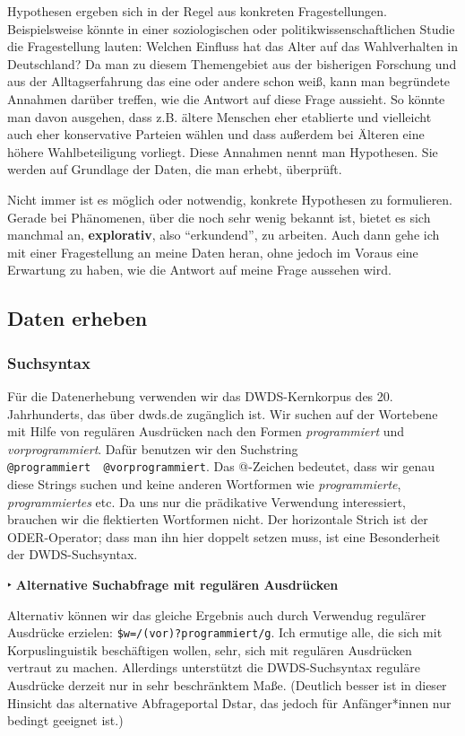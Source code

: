 \documentclass[]{article}
\begin{document}
Hypothesen ergeben sich in der Regel aus konkreten Fragestellungen.
Beispielsweise könnte in einer soziologischen oder
politikwissenschaftlichen Studie die Fragestellung lauten: Welchen
Einfluss hat das Alter auf das Wahlverhalten in Deutschland? Da man zu
diesem Themengebiet aus der bisherigen Forschung und aus der
Alltagserfahrung das eine oder andere schon weiß, kann man begründete
Annahmen darüber treffen, wie die Antwort auf diese Frage aussieht. So
könnte man davon ausgehen, dass z.B. ältere Menschen eher etablierte und
vielleicht auch eher konservative Parteien wählen und dass außerdem bei
Älteren eine höhere Wahlbeteiligung vorliegt. Diese Annahmen nennt man
Hypothesen. Sie werden auf Grundlage der Daten, die man erhebt,
überprüft.

Nicht immer ist es möglich oder notwendig, konkrete Hypothesen zu
formulieren. Gerade bei Phänomenen, über die noch sehr wenig bekannt
ist, bietet es sich manchmal an, \textbf{explorativ}, also
\enquote{erkundend}, zu arbeiten. Auch dann gehe ich mit einer
Fragestellung an meine Daten heran, ohne jedoch im Voraus eine Erwartung
zu haben, wie die Antwort auf meine Frage aussehen wird.

\subsection{Daten erheben}\label{daten-erheben}

\subsubsection{Suchsyntax}\label{suchsyntax}

Für die Datenerhebung verwenden wir das DWDS-Kernkorpus des 20.
Jahrhunderts, das über dwds.de zugänglich ist. Wir suchen auf der
Wortebene mit Hilfe von regulären Ausdrücken nach den Formen
\emph{programmiert} und \emph{vorprogrammiert}. Dafür benutzen wir den
Suchstring
\texttt{@programmiert\ \textbar{}\textbar{}\ @vorprogrammiert}. Das
@-Zeichen bedeutet, dass wir genau diese Strings suchen und keine
anderen Wortformen wie \emph{programmierte}, \emph{programmiertes} etc.
Da uns nur die prädikative Verwendung interessiert, brauchen wir die
flektierten Wortformen nicht. Der horizontale Strich \textbar{} ist der
ODER-Operator; dass man ihn hier doppelt setzen muss, ist eine
Besonderheit der DWDS-Suchsyntax.

‣ \textbf{Alternative Suchabfrage mit regulären Ausdrücken}

Alternativ können wir das gleiche Ergebnis auch durch Verwendug
regulärer Ausdrücke erzielen: \texttt{\$w=/(vor)?programmiert/g}. Ich
ermutige alle, die sich mit Korpuslinguistik beschäftigen wollen, sehr,
sich mit regulären Ausdrücken vertraut zu machen. Allerdings unterstützt
die DWDS-Suchsyntax reguläre Ausdrücke derzeit nur in sehr beschränktem
Maße. (Deutlich besser ist in dieser Hinsicht das alternative
Abfrageportal Dstar, das jedoch für Anfänger*innen nur bedingt geeignet
ist.)
\end{document}
